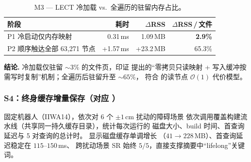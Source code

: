 \documentclass[journal]{IEEEtran}
\begin{document}
\begin{table}[ht]
\centering
\caption{M3 — LECT 冷加载 vs.\ 全遍历的驻留内存占比。}
\label{tab:m3_lazy}
\begin{tabular}{@{}lrrr@{}}
\toprule
\textbf{阶段} & \textbf{耗时} & $\Delta$\textbf{RSS} & $\Delta$\textbf{RSS}\,/\,文件 \\
\midrule
P1 冷启动仅内存映射             & 0.31\,ms & 1.09\,MB & \textbf{2.9\%} \\
P2 顺序触达全部 63{,}271 节点     & +1.57\,ms & +23.2\,MB & 65.3\% \\
\bottomrule
\end{tabular}
\end{table}

\textbf{结论.} 冷加载仅驻留 $\sim\!3\%$ 的文件页，印证
 提出的“零拷贝只读映射 + 写入缓冲按需写时复制”机制；全遍历后驻留升至 $\sim\!65\%$，
符合  的读节点 $\mathcal{O}(1)$ 代价模型。

\subsubsection{S4：终身缓存增量保存（对应 ）}
固定机器人（IIWA14），依次对 6 个 $\pm 1$\,cm 扰动的障碍场景
依次调用覆盖构建流水线（共享同一持久缓存目录），统计每次运行的
磁盘大小、build 时间、首查询延迟与 5 对查询的总计时。
 显示磁盘缓存单调增长
（$41\!\to\!228$\,MB）、首查询延迟稳定在 $115\text{–}150$\,ms、
跨扰动场景 SR 始终 $5/5$，直接支撑摘要中“lifelong”关键词。

\begin{table}[ht]
\centering
\caption{S4 — 连续 6 次跨场景 build 的终身缓存行为（同机器人，$\pm 1$\,cm 障碍物扰动）。}
\label{tab:s4_lifelong}
\end{table}
\end{document}
